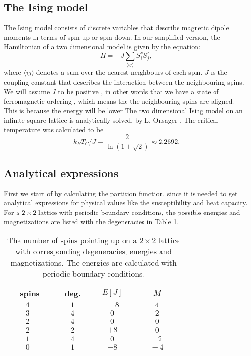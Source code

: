 \documentclass{article}
\begin{document}
\subsection{The Ising model }\label{const_mot}

The Ising model consists of discrete variables that describe magnetic dipole moments in terms of spin up or spin down. In our simplified version, the Hamiltonian of a  two dimensional  model is given by the equation:
\begin{equation}\label{eq:Hamiltonian}
H = -J\sum_{\langle ij \rangle}S^z_i S^z_j,
\end{equation}
where $\langle ij \rangle$ denotes a sum over the nearest neighbours of each spin. $J$ is the coupling constant that describes the interaction between the neighbouring spins. We will assume $J$ to be positive , in other words that we have a state of ferromagnetic ordering , which means the the neighbouring spins are aligned. This is because the energy will be lower 
The two dimensional Ising model on an infinite square lattice is  analytically solved, by L. Onsager . The critical temperature was calculated to be
\begin{equation}
k_B T_C / J = \frac{2}{\ln (1 + \sqrt{2})} \approx 2.2692.
\end{equation}

\subsection{Analytical expressions}\label{const_mot}

First we start of by calculating the partition function, since it  is needed to get analytical expressions for physical values like the susceptibility and heat capacity. For a $2 \times 2$ lattice with periodic boundary conditions, the possible energies and magnetizations are listed with the degeneracies in Table \ref{table:2times2}. 

\begin{table}[]
\caption{The number of spins pointing up on a $2\times 2$ lattice with corresponding degeneracies, energies and magnetizations. The energies are calculated with periodic boundary conditions.} 
\label{table:2times2}
\begin{tabular}{@{}cccc@{}}
\toprule
$\quad$\ spins$\quad$ & deg. & $E [J]$   & $M$  \\ \midrule
$4$     & $\qquad 1\qquad$  & $\quad-8\quad$ & $4$  \\
$3$     & $4$  & $0$   & $2$  \\
$2$     & $4$  & $0$   & $0$  \\
$2$     & $2$  & $+8$ & $0$  \\
$1$     & $4$  & $0$   & $-2$ \\
$0$     & $1$  & $-8$ & $\qquad -4\qquad$ \\ \bottomrule
\end{tabular}
\end{table}
\end{document}
